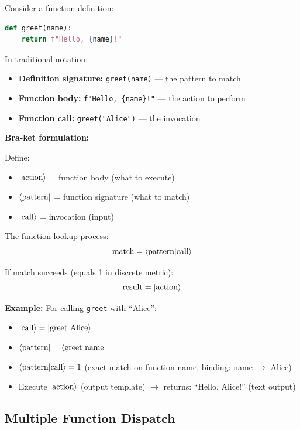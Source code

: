 \documentclass[11pt,a4paper]{article}
\theoremstyle{definition}
\begin{document}
Consider a function definition:
\begin{lstlisting}[language=Python]
def greet(name):
    return f"Hello, {name}!"
\end{lstlisting}

In traditional notation:
\begin{itemize}
\item \textbf{Definition signature:} \texttt{greet(name)} --- the pattern to match
\item \textbf{Function body:} \texttt{f"Hello, \{name\}!"} --- the action to perform
\item \textbf{Function call:} \texttt{greet("Alice")} --- the invocation
\end{itemize}

\textbf{Bra-ket formulation:}

Define:
\begin{itemize}
\item $\ket{\text{action}}$ = function body (what to execute)
\item $\bra{\text{pattern}}$ = function signature (what to match)
\item $\ket{\text{call}}$ = invocation (input)
\end{itemize}

The function lookup process:
\begin{equation}
\text{match} = \braket{\text{pattern}|\text{call}}
\end{equation}

If match succeeds (equals 1 in discrete metric):
\begin{equation}
\text{result} = \ket{\text{action}}
\end{equation}

\textbf{Example:} For calling \texttt{greet} with ``Alice'':
\begin{itemize}
\item $\ket{\text{call}} = \ket{\text{greet Alice}}$
\item $\bra{\text{pattern}} = \bra{\text{greet name}}$
\item $\braket{\text{pattern}|\text{call}} = 1$ (exact match on function name, binding: name $\mapsto$ Alice)
\item Execute $\ket{\text{action}}$ (output template) $\to$ returns: ``Hello, Alice!'' (text output)
\end{itemize}

\subsection{Multiple Function Dispatch}
\end{document}
